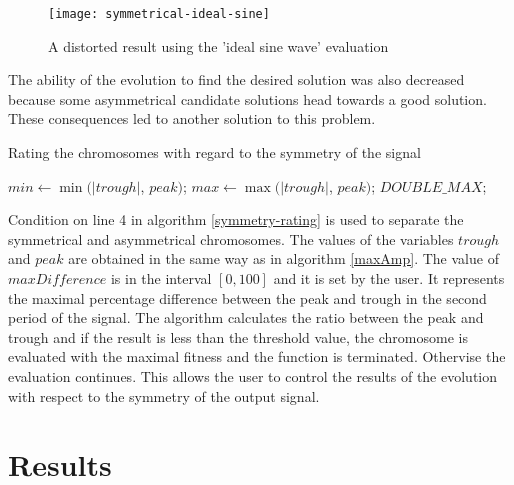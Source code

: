 \begin{figure}[H]
    \centerline{\texttt{[image: symmetrical-ideal-sine]}\label{symmetrical-ideal-sine}}
    \caption{A distorted result using the 'ideal sine wave' evaluation}
\end{figure}

The ability of the evolution to find the desired solution was also decreased because some asymmetrical candidate solutions head towards a good solution. These consequences led to another solution to this problem.

\begin{algorithm}
\caption{Rating the chromosomes with regard to the symmetry of the signal}
\label{symmetry-rating}
\begin{algorithmic}[1]
    \State $min \gets \min(|trough|$, $peak)$;
    \State $max \gets \max(|trough|$, $peak)$;
        \State \Return $DOUBLE\_MAX$;
    \EndIf
    \EndFunction
\end{algorithmic}
\end{algorithm}

Condition on line 4 in algorithm \ref{symmetry-rating} is used to separate the symmetrical and asymmetrical chromosomes. The values of the variables $trough$ and $peak$ are obtained in the same way as in algorithm \ref{maxAmp}. The value of $maxDifference$ is in the interval $\left[0, 100\right]$ and it is set by the user. It represents the maximal percentage difference between the peak and trough in the second period of the signal. The algorithm calculates the ratio between the peak and trough and if the result is less than the threshold value, the chromosome is evaluated with the maximal fitness and the function is terminated. Othervise the evaluation continues. This allows the user to control the results of the evolution with respect to the symmetry of the output signal.

\section{Results}

